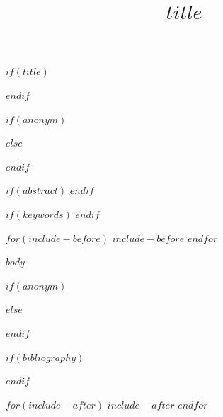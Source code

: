 \documentclass[
    $if(classoption)$
    $for(classoption)$$classoption$$sep$,$endfor$
    $endif$
]{$documentclass$}
\begin{document}
    $if(title)$
    \title[$if(shorttitle)$$shorttitle$$else$$title$$endif$]{$title$}
    $endif$

    $if(anonym)$
        
    $else$
        
    $endif$

    $if(abstract)$
    $endif$

    $if(keywords)$
    $endif$

    \maketitle

$for(include-before)$
$include-before$
$endfor$

    $body$

    \backmatter

    $if(anonym)$
        
    $else$
        
    $endif$

    $if(bibliography)$
    
    $endif$

$for(include-after)$
$include-after$
$endfor$
\end{document}

